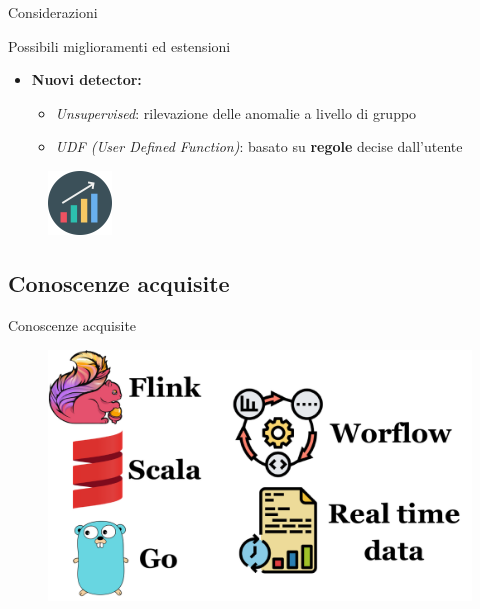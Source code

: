 \documentclass{beamer}
\begin{document}
	\begin{frame}{Considerazioni}
		\begin{block}{Possibili miglioramenti ed estensioni}
			\begin{itemize}
				\item \textbf{Nuovi detector:} 
					\begin{itemize}
						\item \textit{Unsupervised}: rilevazione delle anomalie a livello di gruppo \vspace{.5em}
						\item \textit{UDF (User Defined Function)}: basato su \textbf{regole} decise dall'utente \vspace{.5em}
					\end{itemize}
			\end{itemize}
		\end{block}
		
		\begin{figure}[!h]
    		 \centering
    		\includegraphics[width=1.7cm]{../immagini/slide/increasing-bar-graph.png}
		\end{figure}
	\end{frame}
	
	\subsection{Conoscenze acquisite}

	\begin{frame}{Conoscenze acquisite}
		\begin{figure}[!h]
    		 \centering
    		\includegraphics[width=1\columnwidth]{../immagini/slide/learned.pdf}
		\end{figure}
	\end{frame}
\end{document}

